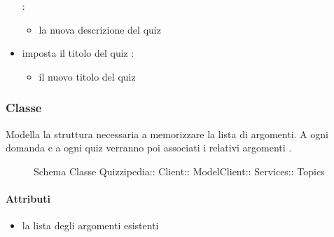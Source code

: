 \begin{itemize}
 :
\begin{itemize}
\item {}
\newline
la nuova descrizione del quiz
\end{itemize}
\item {}
\newline
imposta il titolo del quiz
\newline
{} :
\begin{itemize}
\item {}
\newline
il nuovo titolo del quiz
\end{itemize}
\end{itemize}
\subsubsection{Classe }
Modella la struttura necessaria a memorizzare la lista di argomenti. A ogni domanda e a ogni quiz verranno poi associati i relativi argomenti .
\begin{figure}[H]
\centering
\noindent{}
\caption[Schema Classe Topics]{Schema Classe Quizzipedia:: Client:: ModelClient:: Services:: Topics}
\end{figure}
\paragraph{Attributi}
\begin{itemize}
\item {}
\newline
la lista degli argomenti esistenti
\end{itemize}
